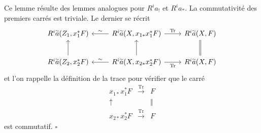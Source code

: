\documentclass[10pt]{article}
\newcommand{\Tr}{\operatorname{Tr}}
\newcommand{\QED}{\hfill$\square$}
\begin{document}
Ce lemme résulte des lemmes analogues pour $R^ia_!$ et $R^ia_*$. La commutativité des premiers carrés est triviale. Le dernier se récrit
\begin{equation*}
\begin{tikzcd}[column sep=2.4em,row sep=2.2em]
R^i\widetilde a(Z_1,x_1^*F) &
R^i\widetilde a(X,x_{1*}x_1^*F) \arrow[l,"\sim"'] \arrow[r,"\Tr"] &
R^i\widetilde a(X,F) \\
R^i\widetilde a(Z_2,x_2^*F) \arrow[u] &
R^i\widetilde a(X,x_{2*}x_2^*F) \arrow[l,"\sim"'] \arrow[u] \arrow[r,"\Tr"'] &
R^i\widetilde a(X,F) \arrow[u,equal]
\end{tikzcd}
\end{equation*}
et l'on rappelle la définition de la trace pour vérifier que le carré
\[
\begin{array}{ccc}
x_{1*}x_1^*F&\xrightarrow{\Tr}&F\\
\uparrow&&\Vert\\
x_{2*}x_2^*F&\xrightarrow{\Tr}&F
\end{array}
\]
est commutatif. \QED
\end{document}
